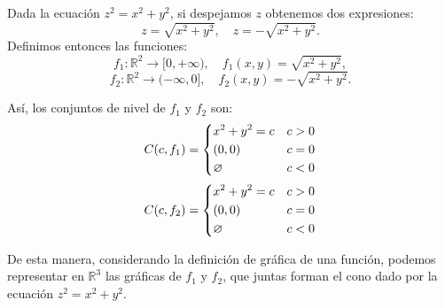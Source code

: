     
    \begin{obs}
        Dada la ecuación \( z^2 = x^2 + y^2 \), si despejamos \( z \) obtenemos dos expresiones:
        \[
        z = \sqrt{x^2 + y^2} ,
        \quad
        z = -\sqrt{x^2 + y^2}.
        \]
        Definimos entonces las funciones:
        \[
        f_1 : \mathbb{R}^2 \to [0,+\infty), \quad f_1(x,y) = \sqrt{x^2 + y^2},
        \]
        \[
        f_2 : \mathbb{R}^2 \to (-\infty,0], \quad f_2(x,y) = -\sqrt{x^2 + y^2}.
        \]
        
        Así, los conjuntos de nivel de \( f_1 \) y \( f_2 \) son:
        \[
        C(c,f_1)=
        \begin{dcases}
        x^2+y^2=c  &  c>0 \\
        (0,0)  & c=0\\
        \varnothing  & c<0\\
        \end{dcases}
        \]
        \[
        C(c,f_2)=
        \begin{dcases}
        x^2+y^2=c  &  c>0 \\
        (0,0)  & c=0\\
        \varnothing  & c<0\\
        \end{dcases}
        \]

        De esta manera, considerando la definición de gráfica de una función, podemos representar en \(\mathbb{R}^3\) las gráficas de \( f_1 \) y \( f_2 \), que juntas forman el cono dado por la ecuación \( z^2 = x^2 + y^2 \).
        
        \begin{center}
\end{center}
\end{obs}
